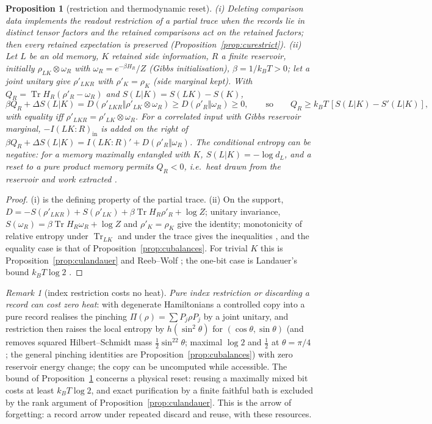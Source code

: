\documentclass[aps,pra,onecolumn,superscriptaddress,nofootinbib,10pt]{revtex4-2}
\newtheorem{proposition}[theorem]{Proposition}
\theoremstyle{definition}
\theoremstyle{remark}
\newtheorem{remark}[theorem]{Remark}
\newcommand{\tr}{\operatorname{Tr}}
\begin{document}
\begin{proposition}[restriction and thermodynamic reset]\label{prop:fmheat}
(i) Deleting comparison data implements the readout restriction of a partial trace when the records lie
in distinct tensor factors and the retained comparisons act on the retained factors; then every retained
expectation is preserved (Proposition~\ref{prop:curestrict}).
(ii) Let $L$ be an old memory, $K$ retained side information, $R$ a finite reservoir, initially $\rho_{LK}\otimes\omega_R$ with
$\omega_R=e^{-\beta H_R}/Z$ (Gibbs initialisation), $\beta=1/k_BT>0$; let a joint unitary give $\rho'_{LKR}$ with $\rho'_K=\rho_K$ (side marginal
kept).  With $Q_R=\tr H_R(\rho'_R-\omega_R)$ and $S(L|K)=S(LK)-S(K)$,
\[
\beta Q_R+\Delta S(L|K)=D(\rho'_{LKR}\Vert\rho'_{LK}\otimes\omega_R)\ge D(\rho'_R\Vert\omega_R)\ge0,\qquad\text{so}\qquad Q_R\ge k_BT\,[S(L|K)-S'(L|K)],
\]
with equality iff $\rho'_{LKR}=\rho'_{LK}\otimes\omega_R$.  For a correlated input with Gibbs reservoir marginal, $-I(LK{:}R)_{\mathrm{in}}$ is added on the
right of $\beta Q_R+\Delta S(L|K)=I(LK{:}R)'+D(\rho'_R\Vert\omega_R)$.  The conditional entropy can be negative: for a
memory maximally entangled with $K$, $S(L|K)=-\log d_L$, and a reset to a pure product memory permits $Q_R<0$, i.e.\ heat
drawn from the reservoir and work extracted \cite{rf:delRio2011}.
\end{proposition}
\begin{proof}
(i) is the defining property of the partial trace.  (ii) On the support, $D=-S(\rho'_{LKR})+S(\rho'_{LK})+\beta\tr H_R\rho'_R+\log Z$; unitary invariance,
$S(\omega_R)=\beta\tr H_R\omega_R+\log Z$ and $\rho'_K=\rho_K$ give the identity; monotonicity of relative entropy under $\tr_{LK}$ and under the
trace gives the inequalities \cite{n2-lindblad,n2-uhlmann-dpi}, and the equality case is that of
Proposition~\ref{prop:cubalances}.  For trivial $K$ this is Proposition~\ref{prop:culandauer} and Reeb--Wolf
\cite[Thm.~3]{n1-reeb}; the one-bit case is Landauer's bound $k_BT\log2$ \cite{n1-landauer,n2-bennett}.
\end{proof}

\begin{remark}[index restriction costs no heat]\label{rem:fmzeroheat}
\emph{Pure index restriction or discarding a record can cost zero heat}: with degenerate Hamiltonians a
controlled copy into a pure record realises the pinching $\Pi(\rho)=\sum P_j\rho P_j$ by a joint unitary, and restriction then
raises the local entropy by $h(\sin^2\theta)$ for $(\cos\theta,\sin\theta)$ (and removes squared Hilbert--Schmidt mass $\tfrac12\sin^22\theta$; maximal
$\log2$ and $\tfrac12$ at $\theta=\pi/4$; the general pinching identities are Proposition~\ref{prop:cubalances}) with zero
reservoir energy change; the copy can be uncomputed while accessible.  The bound of
Proposition~\ref{prop:fmheat} concerns a physical reset: reusing a maximally mixed bit costs at least $k_BT\log2$, and
exact purification by a finite faithful bath is excluded by the rank argument of
Proposition~\ref{prop:culandauer}.  This is the arrow of forgetting: a record arrow under repeated discard and
reuse, with these resources.
\end{remark}
\end{document}
